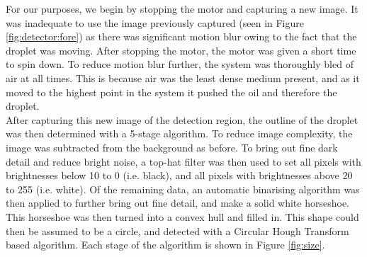 \documentclass{physics_article_B}
\begin{document}
            For our purposes, we begin by stopping the motor and capturing a new image. It was inadequate to use the image previously captured (seen in Figure \ref{fig:detector:fore}) as there was significant motion blur owing to the fact that the droplet was moving. After stopping the motor, the motor was given a short time to spin down. To reduce motion blur further, the system was thoroughly bled of air at all times. This is because air was the least dense medium present, and as it moved to the highest point in the system it pushed the oil and therefore the droplet.\\ 
            
            After capturing this new image of the detection region, the outline of the droplet was then determined with a 5-stage algorithm. To reduce image complexity, the image was subtracted from the background as before. To bring out fine dark detail and reduce bright noise, a top-hat filter was then used to set all pixels with brightnesses below 10 to 0 (i.e. black), and all pixels with brightnesses above 20 to 255 (i.e. white). Of the remaining data, an automatic binarising algorithm was then applied to further bring out fine detail, and make a solid white horseshoe. This horseshoe was then turned into a convex hull and filled in. This shape could then be assumed to be a circle, and detected with a Circular Hough Transform based algorithm\cite{imfindcircles}. Each stage of the algorithm is shown in Figure \ref{fig:size}.\\
            
\end{document}

